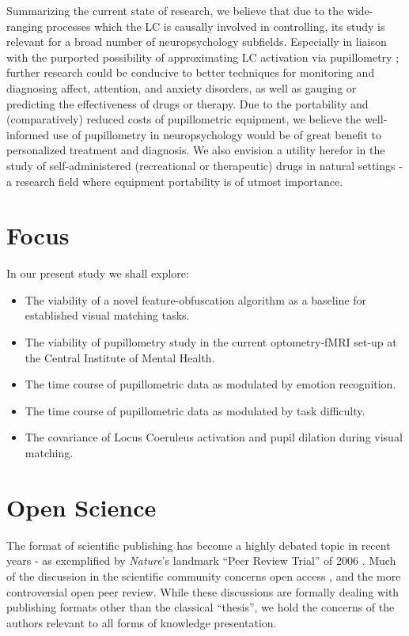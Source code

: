 	Summarizing the current state of research, we believe that due to the wide-ranging processes which the LC is causally involved in controlling, its study is relevant for a broad number of neuropsychology subfields.
	Especially in liaison with the purported possibility of approximating LC activation via pupillometry \cite{Gilzenrat2010,Murphy2011}; further research could be conducive to better techniques for monitoring and diagnosing affect, attention, and anxiety disorders, as well as gauging or predicting the effectiveness of drugs or therapy.
	Due to the portability \cite{Bradley2010} and (comparatively) reduced costs of pupillometric equipment, we believe the well-informed use of pupillometry in neuropsychology would be of great benefit to personalized treatment and diagnosis.
	We also envision a utility herefor in the study of self-administered (recreational or therapeutic) drugs in natural settings - a research field where equipment portability is of utmost importance.
    \section{Focus}
	In our present study we shall explore:
	\begin{itemize}
	    \item The viability of a novel feature-obfuscation algorithm as a baseline for established visual matching tasks.
	    \item The viability of pupillometry study in the current optometry-fMRI set-up at the Central Institute of Mental Health.
	    \item The time course of pupillometric data as modulated by emotion recognition.
	    \item The time course of pupillometric data as modulated by task difficulty.
	    \item The covariance of Locus Coeruleus activation and pupil dilation during visual matching.
	\end{itemize}
	

\iffalse
    \section{Open Science}\label{sec:b_os}
	The format of scientific publishing has become a highly debated topic in recent years - as exemplified by \textit{Nature}'s landmark “Peer Review Trial” of 2006 \cite{Nature-debate2006}.
	Much of the discussion in the scientific community concerns open access \cite{VanNoorden2013,Parker2013}, and the more controversial open peer review.
	While these discussions are formally dealing with publishing formats other than the classical “thesis”, we hold the concerns of the authors relevant to all forms of knowledge presentation.
	
